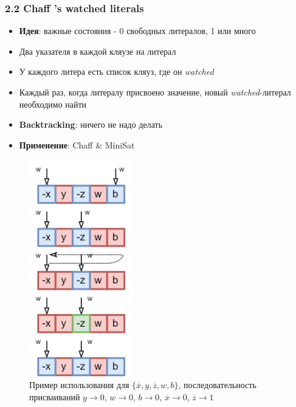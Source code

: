 \documentclass[aspectratio=169,xcolor=table,english]{beamer}
\begin{document}
\begin{frame}[fragile] \frametitle{2.2 Chaff ’s watched literals}
    \begin{minipage}[m]{0.55\linewidth}
        \begin{itemize}
            \item \textbf{Идея}: важные состояния - 0 свободных литералов, 1 или много
            \item Два указателя в каждой кляузе на литерал
            \item У каждого литера есть список кляуз, где он \textit{watched}
            \item Каждый раз, когда литералу присвоено значение, новый \textit{watched}-литерал необходимо найти
            \item \textbf{Backtracking}: ничего не надо делать
            \item \textbf{Применение}: Chaff \& MiniSat
        \end{itemize}
    \end{minipage}\hfill
    \begin{minipage}[m]{0.4\linewidth}
        \begin{figure}
            \centering
            \includegraphics[width=0.4\textwidth]{figures/watched literals.png}
            \caption{Пример использования для $\{\overline{x},y,\overline{z},w,b\}$, последовательность присваиваний $y \rightarrow 0$, $w \rightarrow 0$, $b \rightarrow 0$, $\overline{x} \rightarrow 0$, $\overline{z} \rightarrow 1$}
        \end{figure}
    \end{minipage}
\end{frame}
\end{document}
